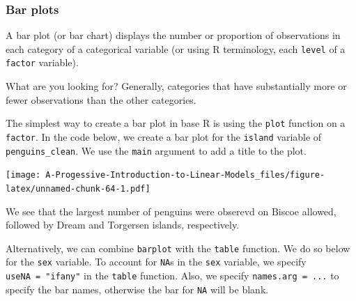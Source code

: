 \documentclass[
]{book}
\newenvironment{Shaded}{\begin{snugshade}}{\end{snugshade}}
\newcommand{\AttributeTok}[1]{\textcolor[rgb]{0.77,0.63,0.00}{#1}}
\newcommand{\FunctionTok}[1]{\textcolor[rgb]{0.00,0.00,0.00}{#1}}
\newcommand{\NormalTok}[1]{#1}
\newcommand{\SpecialCharTok}[1]{\textcolor[rgb]{0.00,0.00,0.00}{#1}}
\newcommand{\StringTok}[1]{\textcolor[rgb]{0.31,0.60,0.02}{#1}}
\theoremstyle{definition}
\theoremstyle{definition}
\theoremstyle{definition}
\theoremstyle{definition}
\theoremstyle{remark}
\begin{document}
\hypertarget{bar-plots}{%
\subsubsection{Bar plots}\label{bar-plots}}

A bar plot (or bar chart) displays the number or proportion of observations in each category of a categorical variable (or using R terminology, each \texttt{level} of a \texttt{factor} variable).

What are you looking for? Generally, categories that have substantially more or fewer observations than the other categories.

The simplest way to create a bar plot in base R is using the \texttt{plot} function on a \texttt{factor}. In the code below, we create a bar plot for the \texttt{island} variable of \texttt{penguins\_clean}. We use the \texttt{main} argument to add a title to the plot.

\begin{Shaded}
\end{Shaded}

\texttt{[image: A-Progessive-Introduction-to-Linear-Models\_files/figure-latex/unnamed-chunk-64-1.pdf]}

We see that the largest number of penguins were obserevd on Biscoe allowed, followed by Dream and Torgersen islands, respectively.

Alternatively, we can combine \texttt{barplot} with the \texttt{table} function. We do so below for the \texttt{sex} variable. To account for \texttt{NA}s in the \texttt{sex} variable, we specify \texttt{useNA\ =\ "ifany"} in the \texttt{table} function. Also, we specify \texttt{names.arg\ =\ ...} to specify the bar names, otherwise the bar for \texttt{NA} will be blank.

\begin{Shaded}
\end{Shaded}
\end{document}
